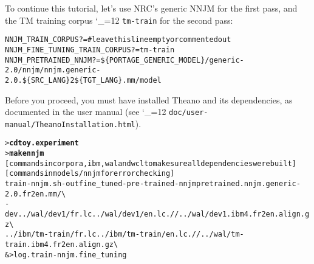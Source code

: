 \documentclass[11pt,letterpaper]{article}
\newcommand{\bs}{\textbackslash{}}
\def\code{\begingroup\catcode`\_=12 \codex}
\newcommand{\codex}[1]{\texttt{#1}\endgroup}
\begin{document}
To continue this tutorial, let's use NRC's generic NNJM for the first pass, and
the TM training corpus \code{tm-train} for the second pass:
\begin{small}
\begin{alltt}
   NNJM_TRAIN_CORPUS ?=   # leave this line empty or commented out
   NNJM_FINE_TUNING_TRAIN_CORPUS ?= tm-train
   NNJM_PRETRAINED_NNJM ?= \$\{PORTAGE_GENERIC_MODEL\}/generic-2.0/nnjm/nnjm.generic-
2.0.\$\{SRC_LANG\}2\$\{TGT_LANG\}.mm/model
\end{alltt}
\end{small}

Before you proceed, you must have installed Theano and its dependencies, as
documented in the user manual (see \code{doc/user-manual/TheanoInstallation.html}).

\begin{small}
\begin{alltt}
   > \textbf{cd toy.experiment}
   > \textbf{make nnjm}
   [commands in corpora, ibm, wal and wcl to make sure all dependencies were built]
   [commands in models/nnjm for error checking]
   train-nnjm.sh -out fine_tuned -pre-trained-nnjm pretrained.nnjm.generic-2.0.fr2en.mm/ \bs
      -dev ../wal/dev1/fr.lc ../wal/dev1/en.lc .//../wal/dev1.ibm4.fr2en.align.gz \bs
      ../ibm/tm-train/fr.lc ../ibm/tm-train/en.lc .//../wal/tm-train.ibm4.fr2en.align.gz \bs
      &> log.train-nnjm.fine_tuning
\end{alltt}
\end{small}
\end{document}
